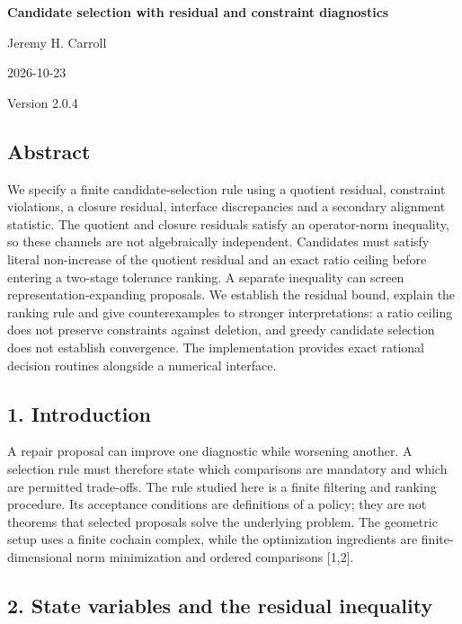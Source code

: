 \documentclass[
]{article}
\author{}
\date{}
\begin{document}
\begin{center}
{\LARGE\bfseries Candidate selection with residual and constraint diagnostics\par}
Jeremy H. Carroll\par
2026-10-23\par
Version 2.0.4\par
\end{center}

\subsection{Abstract}\label{abstract}

We specify a finite candidate-selection rule using a quotient residual,
constraint violations, a closure residual, interface discrepancies and a
secondary alignment statistic. The quotient and closure residuals
satisfy an operator-norm inequality, so these channels are not
algebraically independent. Candidates must satisfy literal non-increase
of the quotient residual and an exact ratio ceiling before entering a
two-stage tolerance ranking. A separate inequality can screen
representation-expanding proposals. We establish the residual bound,
explain the ranking rule and give counterexamples to stronger
interpretations: a ratio ceiling does not preserve constraints against
deletion, and greedy candidate selection does not establish convergence.
The implementation provides exact rational decision routines alongside a
numerical interface.

\subsection{1. Introduction}\label{introduction}

A repair proposal can improve one diagnostic while worsening another. A
selection rule must therefore state which comparisons are mandatory and
which are permitted trade-offs. The rule studied here is a finite
filtering and ranking procedure. Its acceptance conditions are
definitions of a policy; they are not theorems that selected proposals
solve the underlying problem. The geometric setup uses a finite cochain
complex, while the optimization ingredients are finite-dimensional norm
minimization and ordered comparisons {[}1,2{]}.

\subsection{2. State variables and the residual
inequality}\label{state-variables-and-the-residual-inequality}
\end{document}
